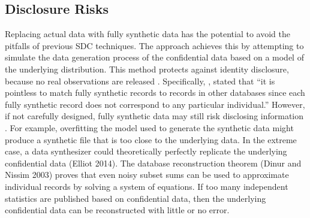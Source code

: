 \documentclass[11pt,runningheads,oribibl]{llncs}
\begin{document}

\subsection{Disclosure Risks}

Replacing actual data with fully synthetic data has the potential to avoid the pitfalls of previous SDC techniques. The approach achieves this by attempting to simulate the data generation process of the confidential data based on a model of the underlying distribution. This method protects against identity disclosure, because no real observations are released \citep{hu2014disclosure, raab2016practical}. Specifically, \cite{hu2014disclosure}, stated that ``it is pointless to match fully synthetic records to records in other databases since each fully synthetic record does not correspond to any particular individual.'' However, if not carefully designed, fully synthetic data may still risk disclosing information \citep{raab2016practical}. For example, overfitting the model used to generate the synthetic data might produce a synthetic file that is too close to the underlying data. In the extreme case, a data synthesizer could theoretically perfectly replicate the underlying confidential data (Elliot 2014). The database reconstruction theorem (Dinur and Nissim 2003) proves that even noisy subset sums can be used to approximate individual records by solving a system of equations. If too many independent statistics are published based on confidential data, then the underlying confidential data can be reconstructed with little or no error.
\end{document}
